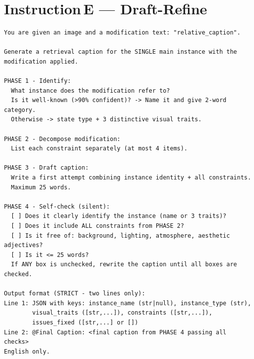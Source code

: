 \section*{Instruction\,E --- Draft-Refine}
\begin{verbatim}
You are given an image and a modification text: "relative_caption".

Generate a retrieval caption for the SINGLE main instance with the
modification applied.

PHASE 1 - Identify:
  What instance does the modification refer to?
  Is it well-known (>90% confident)? -> Name it and give 2-word category.
  Otherwise -> state type + 3 distinctive visual traits.

PHASE 2 - Decompose modification:
  List each constraint separately (at most 4 items).

PHASE 3 - Draft caption:
  Write a first attempt combining instance identity + all constraints.
  Maximum 25 words.

PHASE 4 - Self-check (silent):
  [ ] Does it clearly identify the instance (name or 3 traits)?
  [ ] Does it include ALL constraints from PHASE 2?
  [ ] Is it free of: background, lighting, atmosphere, aesthetic adjectives?
  [ ] Is it <= 25 words?
  If ANY box is unchecked, rewrite the caption until all boxes are checked.

Output format (STRICT - two lines only):
Line 1: JSON with keys: instance_name (str|null), instance_type (str),
        visual_traits ([str,...]), constraints ([str,...]),
        issues_fixed ([str,...] or [])
Line 2: @Final Caption: <final caption from PHASE 4 passing all checks>
English only.
\end{verbatim}
